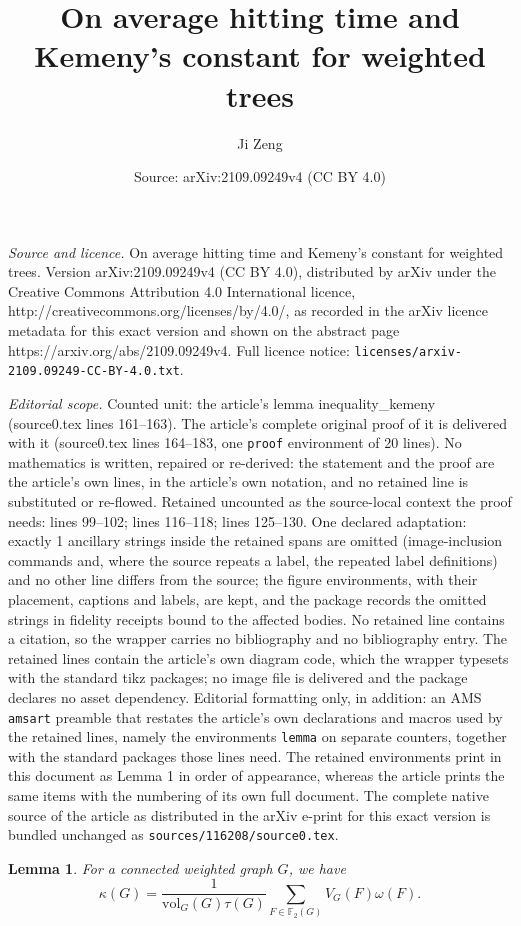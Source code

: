 \documentclass[10pt,a4paper]{amsart}
\title{On average hitting time and Kemeny's constant for weighted trees}
\author{Ji Zeng}
\date{Source: arXiv:2109.09249v4 (CC BY 4.0)}
\newtheorem{lemma}{Lemma}
\newcommand{\vol}{\text{vol}}
\begin{document}
\maketitle

\noindent\emph{Source and licence.} On average hitting time and Kemeny's constant for weighted trees. Version arXiv:2109.09249v4 (CC BY 4.0), distributed by arXiv under the Creative Commons Attribution 4.0 International licence, http://creativecommons.org/licenses/by/4.0/, as recorded in the arXiv licence metadata for this exact version and shown on the abstract page https://arxiv.org/abs/2109.09249v4. Full licence notice: \texttt{licenses/arxiv-2109.09249-CC-BY-4.0.txt}.\par\smallskip

\noindent\textit{Editorial scope.} Counted unit: the article's lemma inequality\_kemeny (source0.tex lines 161--163). The article's complete original proof of it is delivered with it (source0.tex lines 164--183, one \texttt{proof} environment of 20 lines). No mathematics is written, repaired or re-derived: the statement and the proof are the article's own lines, in the article's own notation, and no retained line is substituted or re-flowed.  Retained uncounted as the source-local context the proof needs: lines 99--102; lines 116--118; lines 125--130.  One declared adaptation: exactly 1 ancillary strings inside the retained spans are omitted (image-inclusion commands and, where the source repeats a label, the repeated label definitions) and no other line differs from the source; the figure environments, with their placement, captions and labels, are kept, and the package records the omitted strings in fidelity receipts bound to the affected bodies.  No retained line contains a citation, so the wrapper carries no bibliography and no bibliography entry.  The retained lines contain the article's own diagram code, which the wrapper typesets with the standard tikz packages; no image file is delivered and the package declares no asset dependency.  Editorial formatting only, in addition: an AMS \texttt{amsart} preamble that restates the article's own declarations and macros used by the retained lines, namely the environments \texttt{lemma} on separate counters, together with the standard packages those lines need.  The retained environments print in this document as Lemma 1 in order of appearance, whereas the article prints the same items with the numbering of its own full document.  The complete native source of the article as distributed in the arXiv e-print for this exact version is bundled unchanged as \texttt{sources/116208/source0.tex}.
\begin{lemma}\label{forestformula_kemeny}
For a connected weighted graph $G$, we have
   \[\kappa(G)=\frac{1}{\vol_G(G)\tau(G)}\sum_{F\in \mathbb{F}_2(G)}V_G(F)\omega(F).\]
\end{lemma}
\end{document}
